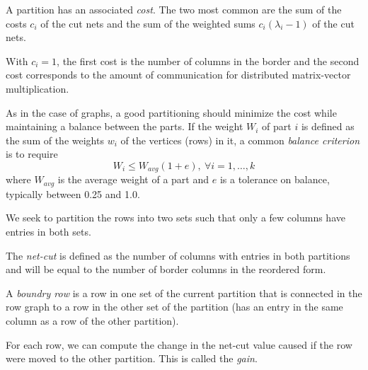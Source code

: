 \begin{defn}
  A partition has an associated \emph{cost}. The two most common are
  the sum of the costs $c_i$ of the cut nets and the sum of the
  weighted sums $c_i(\lambda_i-1)$ of the cut nets. 
\end{defn}

\begin{prop}
  With $c_i=1$, the first cost is the number of columns in the border
  and the second cost corresponds to the amount of communication for
  distributed matrix-vector multiplication.
\end{prop}

\begin{rmk}
  As in the case of graphs, a good partitioning should minimize the
  cost while maintaining a balance between the parts. If the weight
  $W_i$ of part $i$ is defined as the sum of the weights $w_i$ of the
  vertices (rows) in it, a common \emph{balance criterion} is to
  require
  \begin{equation}
    \label{eq:BalanceCriterion}
    W_i\leq W_{avg}(1+e),\ \forall i=1,\ldots,k
  \end{equation}
  where $W_{avg}$ is the average weight of a part and $e$ is a
  tolerance on balance, typically between 0.25 and 1.0.
\end{rmk}

\begin{rmk}
  We seek to partition the rows into two sets such that only a few
  columns have entries in both sets.
\end{rmk}

\begin{defn}
  The \emph{net-cut} is defined as the number of columns with entries
  in both partitions and will be equal to the number of border columns
  in the reordered form.
\end{defn}

\begin{defn}
  A \emph{boundry row} is a row in one set of the current partition
  that is connected in the row graph to a row in the other set of the
  partition (has an entry in the same column as a row of the other
  partition).
\end{defn}

\begin{defn}
  For each row, we can compute the change in the net-cut value caused
  if the row were moved to the other partition. This is called the \emph{gain}.
\end{defn}


